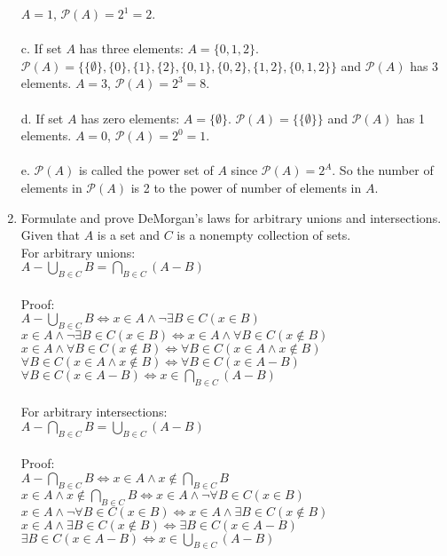\documentclass[]{article}
\begin{document}
\begin{enumerate}
    
    
    
    
    
    
    
    
    
    $A=1$, $\mathcal{P}(A)=2^1=2$.
    \\\\c. If set $A$ has three elements: $A = \{0,1,2\}$. $\mathcal{P}(A) = \{\{ \emptyset \},\{ 0 \},\{ 1 \},\{ 2 \}, \{ 0,1 \}, \{ 0,2 \}, \{ 1,2 \}, \{ 0,1,2 \}\}$ and $\mathcal{P}(A)$ has 3 elements. $A=3$, $\mathcal{P}(A)=2^3=8$.
    \\\\d. If set $A$ has zero elements: $A = \{ \emptyset \}$. $\mathcal{P}(A) = \{\{ \emptyset \}\}$ and $\mathcal{P}(A)$ has 1 elements. $A=0$, $\mathcal{P}(A)=2^0=1$.
    \\\\e. $\mathcal{P}(A)$ is called the power set of $A$ since $\mathcal{P}(A)=2^{A}$. So the number of elements in $\mathcal{P}(A)$ is 2 to the power of number of elements in $A$.
    
    \item Formulate and prove DeMorgan's laws for arbitrary unions and intersections.
    \\ Given that $A$ is a set and $C$ is a nonempty collection of sets.
    \\For arbitrary unions:
    \\ $A - \bigcup_{B \in C}B = \bigcap_{B \in C} (A-B)$
    \\\\Proof:
    \\$A - \bigcup_{B \in C}B \iff x \in A \land \neg \exists B \in C(x \in B)$
    \\$x \in A \land \neg \exists B \in C(x \in B) \iff x \in A \land \forall B \in C(x \notin B)$
    \\$x \in A \land \forall B \in C(x \notin B) 
    \iff \forall B \in C(x \in A \land x \notin B)$
    \\$\forall B \in C(x \in A \land x \notin B) \iff \forall B \in C(x \in A - B)$
    \\$\forall B \in C(x \in A-B) \iff x \in \bigcap_{B \in C}(A-B)$
    \\\\For arbitrary intersections:
    \\ $A - \bigcap_{B \in C}B = \bigcup_{B \in C} (A-B)$
    \\\\Proof:
    \\$A - \bigcap_{B \in C}B \iff x \in A \land x \notin \bigcap_{B \in C} B$
    \\$x \in A \land x \notin \bigcap_{B \in C} B \iff x \in A \land \neg \forall B \in C(x \in B)$
    \\$x \in A \land \neg \forall B \in C(x \in B) \iff x \in A \land \exists B \in C (x \notin B)$
    \\$x \in A \land \exists B \in C (x \notin B) \iff \exists B \in C(x \in A - B)$
    \\$\exists B \in C(x \in A - B) \iff x \in \bigcup_{B \in C}(A-B)$
    

\end{enumerate}
\end{document}
